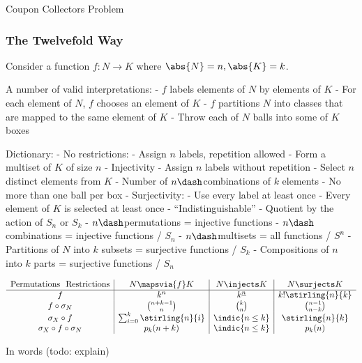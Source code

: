 Coupon Collectors Problem

\hypertarget{the-twelvefold-way}{%
\subsubsection{The Twelvefold Way}\label{the-twelvefold-way}}

Consider a function \(f: N \to K\) where \(\abs{N}=n, \abs{K} = k\).

A number of valid interpretations: - \(f\) labels elements of \(N\) by
elements of \(K\) - For each element of \(N\), \(f\) chooses an element
of \(K\) - \(f\) partitions \(N\) into classes that are mapped to the
same element of \(K\) - Throw each of \(N\) balls into some of \(K\)
boxes

Dictionary: - No restrictions: - Assign \(n\) labels, repetition allowed
- Form a multiset of \(K\) of size \(n\) - Injectivity - Assign \(n\)
labels without repetition - Select \(n\) distinct elements from \(K\) -
Number of \(n\dash\)combinations of \(k\) elements - No more than one
ball per box - Surjectivity: - Use every label at least once - Every
element of \(K\) is selected at least once - ``Indistinguishable'' -
Quotient by the action of \(S_n\) or \(S_k\) - \(n\dash\)permutations =
injective functions - \(n\dash\)combinations = injective functions /
\(S_n\) - \(n\dash\)multisets = all functions / \(S^n\) - Partitions of
\(N\) into \(k\) subsets = surjective functions / \(S_k\) - Compositions
of \(n\) into \(k\) parts = surjective functions / \(S_n\)

\begin{align*}
\begin{array}{c|c|c|c}
\text{Permutations \ Restrictions}  & N \mapsvia{f} K & N \injects K & N \surjects K
\\ \hline
f                                                           & k^n & k^{\underline{n}} & k! \stirling{n}{k}  \\
f \circ \sigma_N                                & {n+k-1}\choose n & k\choose n & {n-1}\choose{n-k} \\
\sigma_X \circ f                                & \sum_{i=0}^k \stirling{n}{i} & \indic{n \leq k} & \stirling{n}{k}\\
\sigma_X \circ f \circ \sigma_N & p_k(n+k) & \indic{n \leq k} & p_k(n)
\end{array}
\end{align*}

In words (todo: explain)

